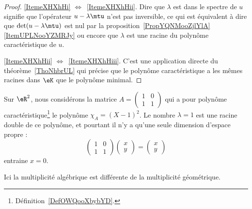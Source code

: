 \begin{proof}
	\ref{ItemeXHXhHi} \( \Leftrightarrow\)~\ref{ItemeXHXhHii}. Dire que \( \lambda\) est dans le spectre de \( u\) signifie que l'opérateur \( u-\lambda\mtu\) n'est pas inversible, ce qui est équivalent à dire que \( \det(u-\lambda\mtu)\) est nul par la proposition~\ref{PropYQNMooZjlYlA}\ref{ItemUPLNooYZMRJy} ou encore que \( \lambda\) est une racine du polynôme caractéristique de \( u\).

	\ref{ItemeXHXhHii} \( \Leftrightarrow\)~\ref{ItemeXHXhHiii}. C'est une application directe du théorème~\ref{ThoNhbrUL} qui précise que le polynôme caractéristique a les mêmes racines dans \(\eK\) que le polynôme minimal.
\end{proof}

\begin{example} \label{ExICOJcFp}
	Sur \( \eR^2\), nous considérons la matrice \( A=\begin{pmatrix}
		1 & 0 \\
		1 & 1
	\end{pmatrix}\) qui a pour polynôme caractéristique\footnote{Définition~\ref{DefOWQooXbybYD}.} le polynôme \( \chi_A=(X-1)^2\). Le nombre \( \lambda=1\) est une racine double de ce polynôme, et pourtant il n'y a qu'une seule dimension d'espace propre :
	\begin{equation}
		\begin{pmatrix}
			1 & 0 \\
			1 & 1
		\end{pmatrix}\begin{pmatrix}
			x \\
			y
		\end{pmatrix}=\begin{pmatrix}
			x \\
			y
		\end{pmatrix}
	\end{equation}
	entraine \( x=0\).

	Ici la multiplicité algébrique est différente de la multiplicité géométrique.
\end{example}

